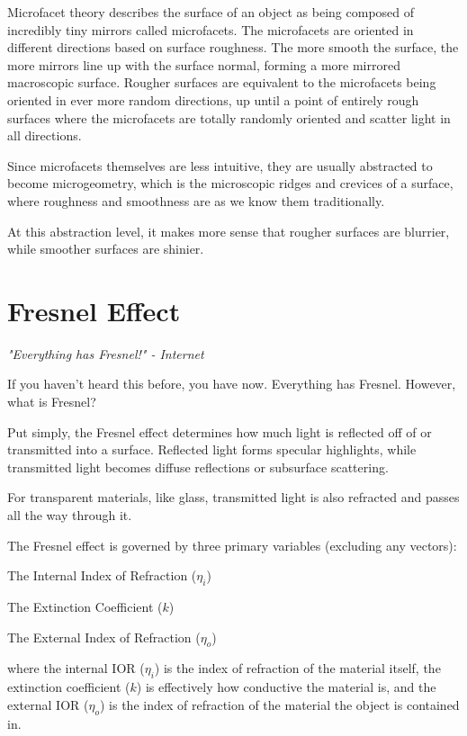 \documentclass[12pt,letterpaper]{article}
\newenvironment{tight_enumerate}{
\begin{enumerate}
  \setlength{\itemsep}{0pt}
  \setlength{\parskip}{0pt}
}{\end{enumerate}}
\begin{document}
Microfacet theory describes the surface of an object as being composed of incredibly tiny mirrors called microfacets. 
The microfacets are oriented in different directions based on surface roughness. The more smooth the surface, the more mirrors line up with the surface normal,
forming a more mirrored macroscopic surface. Rougher surfaces are equivalent to the microfacets being oriented in ever more random directions,
up until a point of entirely rough surfaces where the microfacets are totally randomly oriented and 
scatter light in all directions.

Since microfacets themselves are less intuitive, they are usually abstracted to become microgeometry, 
which is the microscopic ridges and crevices of a surface, where roughness and smoothness are as we know them traditionally.

At this abstraction level, it makes more sense that rougher surfaces are blurrier, while smoother surfaces are shinier.

\newpage

\section{Fresnel Effect}

\textit{"Everything has Fresnel!" - Internet}

If you haven't heard this before, you have now. Everything has Fresnel. However, what is Fresnel?

Put simply, the Fresnel effect determines how much light is reflected off of or transmitted into a surface. 
Reflected light forms specular highlights, while transmitted light becomes diffuse reflections or subsurface scattering.

For transparent materials, like glass, transmitted light is also refracted and passes all the way through it.

The Fresnel effect is governed by three primary variables (excluding any vectors):

\begin{tight_enumerate}
    \item The Internal Index of Refraction ($\eta_i$)
    \item The Extinction Coefficient ($k$)
    \item The External Index of Refraction ($\eta_o$)
\end{tight_enumerate}

where the internal IOR ($\eta_i$) is the index of refraction of the material itself, 
the extinction coefficient ($k$) is effectively how conductive the material is, and the external IOR ($\eta_o$) is the 
index of refraction of the material the object is contained in. 
\end{document}
